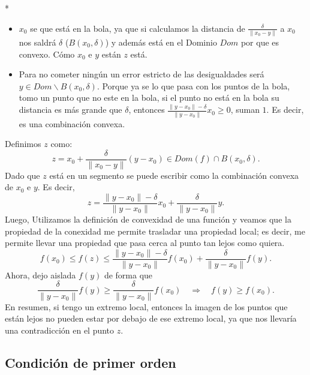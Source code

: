 \begin{paracol}{2}
\begin{teo}
    \switchcolumn[1]*{\noindent\scriptsize
	\begin{itemize}
	    \item $x_0$ se que está en la bola, ya que si calculamos la distancia de $\frac{\delta}{\|x_0-y\|}$ a $x_0$ nos saldrá $\delta$ ($B(x_0,\delta)$) y además está en el Dominio $Dom$ por que es convexo. Cómo $x_0$ e $y$ están $z$ está.
	    \item Para no cometer ningún un error estricto de las desigualdades será $y\in Dom\backslash B(x_0,\delta)$. Porque ya se lo que pasa con los puntos de la bola, tomo un punto que no este en la bola, si el punto no está en la bola su distancia es más grande que $\delta$, entonces $\frac{\|y-x_0\|-\delta}{\|y-x_0\|}x_0\geq 0$, suman $1$. Es decir, es una combinación convexa.
	\end{itemize}
    }
    \switchcolumn[0]\noindent
    Definimos $z$ como:
    $$z=x_0+\dfrac{\delta}{\|x_0-y\|}(y-x_0)\in Dom(f)\cap B(x_0,\delta).$$
    Dado que $z$ está en un segmento se puede escribir como la combinación convexa de $x_0$ e $y$. Es decir,
    $$z=\dfrac{\|y-x_0\|-\delta}{\|y-x_0\|}x_0+\dfrac{\delta}{\|y-x_0\|}y.$$
    Luego, Utilizamos la definición de convexidad de una función y veamos que la propiedad de la conexidad me permite trasladar una propiedad local; es decir, me permite llevar una propiedad que pasa cerca al punto tan lejos como quiera. 
    $$f(x_0)\leq f(z)\leq \dfrac{\|y-x_0\|-\delta}{\|y-x_0\|}f(x_0)+\dfrac{\delta}{\|y-x_0\|}f(y).$$
    Ahora, dejo aislada $f(y)$ de forma que
    $$\dfrac{\delta}{\|y-x_0\|}f(y)\geq \dfrac{\delta}{\|y-x_0\|}f(x_0) \quad \Rightarrow \quad f(y)\geq f(x_0).$$
    En resumen, si tengo un extremo local, entonces la imagen de los puntos que están lejos no pueden estar por debajo de ese extremo local, ya que nos llevaría una contradicción en el punto $z$.
\end{teo}


\subsection{Condición de primer orden}


\end{paracol}
